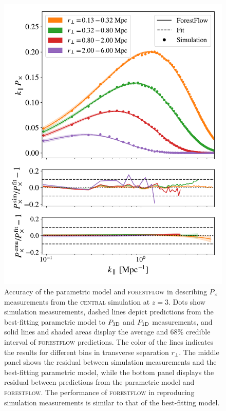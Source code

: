\documentclass[longauth]{aa}
\newcommand{\pcross}{$P_{\times}$\xspace}
\newcommand{\poned}{\ensuremath{P_{\rm 1D}}\xspace}
\newcommand{\pthreed}{\ensuremath{P_{\rm 3D}}\xspace}
\newcommand{\forestflow}{\textsc{forestflow}\xspace}
\newcommand{\simcentral}{\textsc{central}\xspace}
\begin{document}
\begin{figure}
    \centering
    \includegraphics[width=.9\columnwidth]{figures/Pcross_central_snap6_kPx_allbin_emupred_first4_withfracerr.pdf}
    \caption{Accuracy of the parametric model and \forestflow in describing \pcross measurements from the \simcentral simulation at $z=3$. Dots show simulation measurements, dashed lines depict predictions from the best-fitting parametric model to \pthreed and \poned measurements, and solid lines and shaded areas display the average and 68\% credible interval of \forestflow predictions. The color of the lines indicates the results for different bins in transverse separation $r_\perp$. The middle panel shows the residual between simulation measurements and the best-fitting parametric model, while the bottom panel displays the residual between predictions from the parametric model and \forestflow. The performance of \forestflow in reproducing simulation measurements is similar to that of the best-fitting model.}
    \label{fig:Px_onesnap}
\end{figure}
\end{document}
